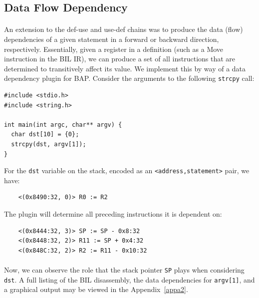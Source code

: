 \documentclass[letterpaper,11pt]{article}
\begin{document}
\subsection{Data Flow Dependency}

\paragraph{}
An extension to the def-use and use-def chains was to produce the data (flow)
dependencies of a given statement in a forward or backward direction,
respectively. Essentially, given a register in a definition (such as a Move
instruction in the BIL IR), we can produce a set of all instructions that are
determined to transitively affect its value. We implement this
by way of a data dependency plugin for BAP. Consider the arguments to the
following \texttt{strcpy} call:

\begin{center}
\lstset{language=C, label=strcpy_src,
caption=strcpy.c, breaklines=true, basicstyle=\tiny, numbers=none}
\begin{lstlisting}
#include <stdio.h>
#include <string.h>

int main(int argc, char** argv) {
  char dst[10] = {0};
  strcpy(dst, argv[1]);
}
\end{lstlisting}
\end{center}

For the \texttt{dst} variable on the stack, encoded as an
\texttt{<address,statement>} pair, we have:

\begin{verbatim}
    <(0x8490:32, 0)> R0 := R2
\end{verbatim}

The plugin will determine all preceding instructions it is dependent on:

\begin{verbatim}
    <(0x8444:32, 3)> SP := SP - 0x8:32
    <(0x8448:32, 2)> R11 := SP + 0x4:32
    <(0x848C:32, 2)> R2 := R11 - 0x10:32
\end{verbatim}

\paragraph{}
Now, we can observe the role that the stack pointer \texttt{SP} plays
when considering \texttt{dst}. A full listing of the BIL disassembly,
the data dependencies for \texttt{argv[1]}, and a graphical
output may be viewed in
the Appendix~\ref{appa2}.
\end{document}

